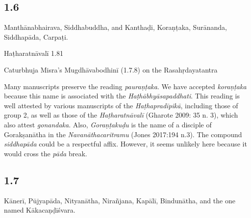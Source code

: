 \begin{ekdosis}
\subsection*{1.6}
\begin{translation}[hp01_006]
Manthānabhairava, Siddhabuddha, and Kanthaḍi, Koraṇṭaka, Surānanda, Siddhapāda, Carpaṭi.
\end{translation}

\begin{testimonia}[hp01_006]
Haṭharatnāvalī 1.81

\begin{versinnote}
\end{versinnote}

Caturbhuja Misra's Mugdhāvabodhinī (1.7.8) on the Rasahṛdayatantra

\begin{versinnote}
\end{versinnote}

\end{testimonia}

\begin{philcomm}[hp01_006]        
Many manuscripts preserve the reading \emph{pauraṇṭaka}. We have accepted \emph{koraṇṭaka} because this name is associated with the \emph{Haṭhābhyāsapaddhati}. This reading is well attested by various manuscripts of the \emph{Haṭhapradīpikā}, including those of group 2, as well as those of the \emph{Haṭharatnāvalī} (Gharote 2009: 35 n. 3), which also attest \emph{gonandaka}. Also, \emph{Goraṇṭakuḍu} is the name of a disciple of Gorakṣanātha in the \emph{Navanāthacaritramu} (Jones 2017:194 n.3). The compound \emph{siddhapāda} could be a respectful affix. However, it seems unlikely here because it would cross the \emph{pāda} break.  
\end{philcomm}

\subsection*{1.7}
\begin{translation}[hp01_007]
Kānerī, Pūjyapāda, Nityanātha, Nirañjana, Kapālī, Bindunātha, and the one named Kākacaṇḍīśvara.
\end{translation}


\end{ekdosis}
